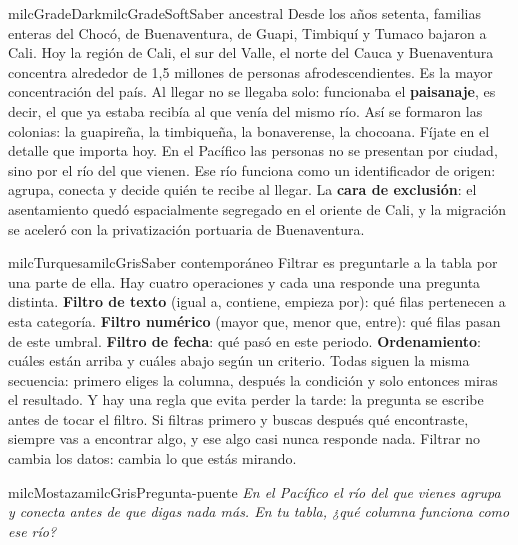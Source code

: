 \documentclass[11pt,letterpaper]{article}
\begin{document}
\begin{softbox}{milcGradeDark}{milcGradeSoft}{Saber ancestral}
Desde los años setenta, familias enteras del Chocó, de Buenaventura, de Guapi, Timbiquí y Tumaco bajaron a Cali. Hoy la región de Cali, el sur del Valle, el norte del Cauca y Buenaventura concentra alrededor de 1,5 millones de personas afrodescendientes. Es la mayor concentración del país. Al llegar no se llegaba solo: funcionaba el \textbf{paisanaje}, es decir, el que ya estaba recibía al que venía del mismo río. Así se formaron las colonias: la guapireña, la timbiqueña, la bonaverense, la chocoana. Fíjate en el detalle que importa hoy. En el Pacífico las personas no se presentan por ciudad, sino por el río del que vienen. Ese río funciona como un identificador de origen: agrupa, conecta y decide quién te recibe al llegar. La \textbf{cara de exclusión}: el asentamiento quedó espacialmente segregado en el oriente de Cali, y la migración se aceleró con la privatización portuaria de Buenaventura.\par{}
\end{softbox}

\begin{softbox}{milcTurquesa}{milcGris}{Saber contemporáneo}
Filtrar es preguntarle a la tabla por una parte de ella. Hay cuatro operaciones y cada una responde una pregunta distinta. \textbf{Filtro de texto} (igual a, contiene, empieza por): qué filas pertenecen a esta categoría. \textbf{Filtro numérico} (mayor que, menor que, entre): qué filas pasan de este umbral. \textbf{Filtro de fecha}: qué pasó en este periodo. \textbf{Ordenamiento}: cuáles están arriba y cuáles abajo según un criterio. Todas siguen la misma secuencia: primero eliges la columna, después la condición y solo entonces miras el resultado. Y hay una regla que evita perder la tarde: la pregunta se escribe antes de tocar el filtro. Si filtras primero y buscas después qué encontraste, siempre vas a encontrar algo, y ese algo casi nunca responde nada. Filtrar no cambia los datos: cambia lo que estás mirando.
\end{softbox}

\begin{softbox}{milcMostaza}{milcGris}{Pregunta-puente}
\textit{En el Pacífico el río del que vienes agrupa y conecta antes de que digas nada más. En tu tabla, ¿qué columna funciona como ese río?}
\end{softbox}
\end{document}
